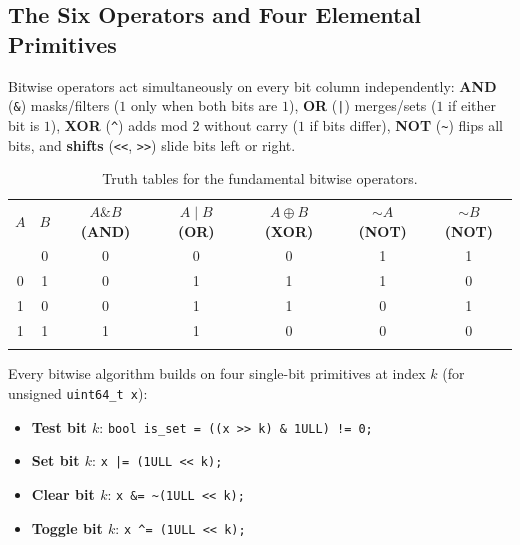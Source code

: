 \documentclass[11pt,a4paper]{article}
\theoremstyle{definition}
\begin{document}
\subsection{The Six Operators and Four Elemental Primitives}

Bitwise operators act simultaneously on every bit column independently: \textbf{AND} (\texttt{\&}) masks/filters ($1$ only when both bits are $1$), \textbf{OR} (\texttt{|}) merges/sets ($1$ if either bit is $1$), \textbf{XOR} (\texttt{\textasciicircum}) adds mod $2$ without carry ($1$ if bits differ), \textbf{NOT} (\texttt{\textasciitilde}) flips all bits, and \textbf{shifts} (\texttt{<<}, \texttt{>>}) slide bits left or right.

\begin{table}[htbp]
\centering
\begingroup\small{}
\begin{tabular}{ccccccc}
\arrayrulecolor{primaryblue}\toprule[1.1pt]
\rowcolor{primaryblue!10}
\textcolor{primaryblue}{\textbf{$A$}} & \textcolor{primaryblue}{\textbf{$B$}} & \textcolor{primaryblue}{\textbf{$A \mathbin{\&} B$ (AND)}} & \textcolor{primaryblue}{\textbf{$A \mid B$ (OR)}} & \textcolor{primaryblue}{\textbf{$A \oplus B$ (XOR)}} & \textcolor{primaryblue}{\textbf{$\sim A$ (NOT)}} & \textcolor{primaryblue}{\textbf{$\sim B$ (NOT)}} \\
\arrayrulecolor{codeframe}\midrule[0.6pt]
0 & 0 & 0 & 0 & 0 & 1 & 1 \\
0 & 1 & 0 & 1 & 1 & 1 & 0 \\
1 & 0 & 0 & 1 & 1 & 0 & 1 \\
1 & 1 & 1 & 1 & 0 & 0 & 0 \\
\arrayrulecolor{primaryblue}\bottomrule[1.1pt]
\end{tabular}\endgroup
\caption{Truth tables for the fundamental bitwise operators.}
\label{tab:bitwise_truth_tables}
\end{table}

Every bitwise algorithm builds on four single-bit primitives at index $k$ (for unsigned \texttt{uint64\_t x}):
\begin{itemize}[itemsep=2pt]
    \item \textbf{Test bit $k$}: \texttt{bool is\_set = ((x >> k) \& 1ULL) != 0;}
    \item \textbf{Set bit $k$}: \texttt{x |= (1ULL << k);}
    \item \textbf{Clear bit $k$}: \texttt{x \&= \textasciitilde(1ULL << k);}
    \item \textbf{Toggle bit $k$}: \texttt{x \textasciicircum= (1ULL << k);}
\end{itemize}
\end{document}
